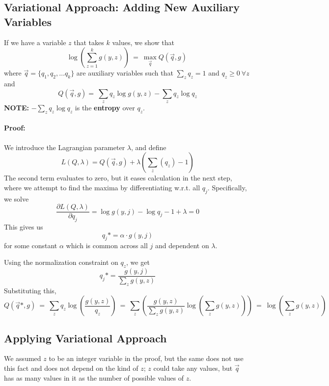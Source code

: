 \documentclass[a4paper]{article}
\begin{document}
\subsection{Variational Approach: Adding New Auxiliary Variables}
If we have a variable $z$ that takes $k$ values, we show that \[
\log\left( \sum_{z = 1}^{k} g(y, z) \right)\ =\ \max_{\vec{q}} Q(\vec{q}, g)\ 
\] where $\vec{q} = \{q_1, q_2, \dots q_k\}$ are auxiliary variables such that $\sum_{z} q_z = 1$ and $q_z \geq 0\ \forall z$ and
\[
Q(\vec{q}, g) =\ \sum_{z} q_z \log g(y, z) - \sum_{z} q_z \log q_z 
\]
\textbf{NOTE: }$- \sum_{z} q_z \log q_z $ is the \textbf{entropy} over $q_z$.\\ \\
\textbf{Proof:} \\ \\
We introduce the Lagrangian parameter $\lambda$, and define $$L(Q, \lambda) = Q(\vec{q}, g) + \lambda \left( \sum_{z} (q_z) - 1\right) $$
The second term evaluates to zero, but it eases calculation in the next step, where we attempt to find the maxima by differentiating w.r.t. all $q_j$. Specifically, we solve \[
\frac{\partial L(Q, \lambda)}{\partial q_j} = \log g(y, j) - \log q_j - 1 + \lambda = 0
\] This gives us 
$$q_j* = \alpha\cdot g(y, j)$$
for some constant $\alpha$ which is common across all $j$ and dependent on $\lambda$.

Using the normalization constraint on $q_z$, we get 
$$q_j* = \frac{{g(y, j)}}{\sum_z g(y, z)}$$
Substituting this, \[
Q(\vec{q}*, g)\ =\ \sum_z  q_z \log \left( \frac{g(y, z)}{q_z} \right)\ =\  
\sum_z \left( \frac{g(y, z)}{\sum_z g(y, z)} \log \left( \sum_z g(y, z) \right) \right)\ =\ 
\log \left( \sum_z g(y, z) \right)
\]

\subsection{Applying Variational Approach}
We assumed $z$ to be an integer variable in the proof, but the same does not use this fact and does not depend on the kind of $z$; $z$ could take any values, but $\vec{q}$ has as many values in it as the number of possible values of $z$. \hfill \\
\end{document}
